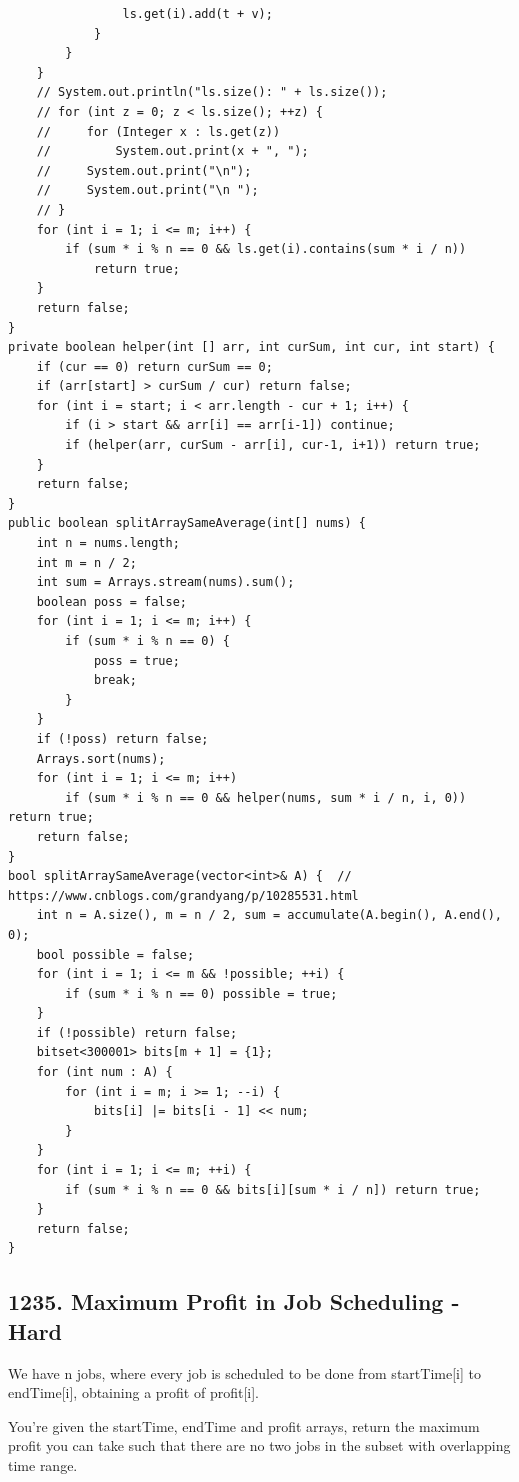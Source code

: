 \documentclass[9pt, b5paaper]{book}
\begin{document}
\begin{verbatim}
                ls.get(i).add(t + v);
            }
        }
    }
    // System.out.println("ls.size(): " + ls.size());
    // for (int z = 0; z < ls.size(); ++z) {
    //     for (Integer x : ls.get(z))
    //         System.out.print(x + ", ");
    //     System.out.print("\n");
    //     System.out.print("\n ");
    // }
    for (int i = 1; i <= m; i++) {
        if (sum * i % n == 0 && ls.get(i).contains(sum * i / n))
            return true;
    }
    return false;
}
private boolean helper(int [] arr, int curSum, int cur, int start) {
    if (cur == 0) return curSum == 0;
    if (arr[start] > curSum / cur) return false;
    for (int i = start; i < arr.length - cur + 1; i++) {
        if (i > start && arr[i] == arr[i-1]) continue;
        if (helper(arr, curSum - arr[i], cur-1, i+1)) return true;
    }
    return false;
}
public boolean splitArraySameAverage(int[] nums) {
    int n = nums.length;
    int m = n / 2;
    int sum = Arrays.stream(nums).sum();
    boolean poss = false;
    for (int i = 1; i <= m; i++) {
        if (sum * i % n == 0) {
            poss = true;
            break;
        }
    }
    if (!poss) return false;
    Arrays.sort(nums);
    for (int i = 1; i <= m; i++) 
        if (sum * i % n == 0 && helper(nums, sum * i / n, i, 0)) return true;
    return false;
}
bool splitArraySameAverage(vector<int>& A) {  // https://www.cnblogs.com/grandyang/p/10285531.html
    int n = A.size(), m = n / 2, sum = accumulate(A.begin(), A.end(), 0);
    bool possible = false;
    for (int i = 1; i <= m && !possible; ++i) {
        if (sum * i % n == 0) possible = true;
    }
    if (!possible) return false;
    bitset<300001> bits[m + 1] = {1};
    for (int num : A) {
        for (int i = m; i >= 1; --i) {
            bits[i] |= bits[i - 1] << num;
        }
    }
    for (int i = 1; i <= m; ++i) {
        if (sum * i % n == 0 && bits[i][sum * i / n]) return true;
    }
    return false;
}
\end{verbatim}
\subsection{1235. Maximum Profit in Job Scheduling - Hard}
\label{sec-1-4-3}
We have n jobs, where every job is scheduled to be done from startTime[i] to endTime[i], obtaining a profit of profit[i].

You're given the startTime, endTime and profit arrays, return the maximum profit you can take such that there are no two jobs in the subset with overlapping time range.
\end{document}
